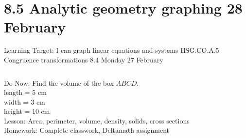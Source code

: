 \section{8.5 Analytic geometry graphing \hfill 28 February \,}
\begin{frame}{Learning Target: I can graph linear equations and systems}
  {HSG.CO.A.5 Congruence transformations \hfill \alert{8.4 Monday 27 February}}
  \begin{columns}
    Do Now: Find the volume of the box $ABCD$. \\
    length = 5 cm \\
    width = 3 cm\\
    height = 10 cm \\[0.5cm]
    Lesson: Area, perimeter, volume, density, solids, cross sections \\
    Homework: Complete classwork, Deltamath assignment
    \begin{flushright}
    \end{flushright}
  \end{columns}
\end{frame}

